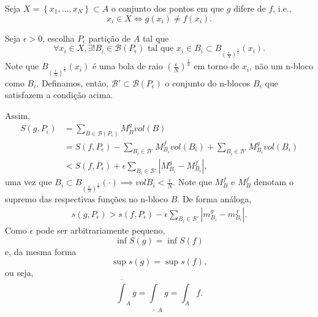 \documentclass[a4paper]{report}
\begin{document}

Seja $X=\left\{ x_1,\ldots,x_N \right\} \subset A$ o conjunto dos pontos em que $g$ difere de $f$, i.e., \[
x_i\in X \iff g\left( x_i \right) \neq f\left( x_i \right) 
.\] 

Seja $\epsilon>0$, escolha $P_\epsilon$ partição de $A$ tal que \[
    \forall x_i \in X, \exists! B_i\in \mathcal{B}\left( P_\epsilon \right) \text{ tal que } x_i\in  B_i \subset B_{\left( \frac{\epsilon}{N} \right)^{\frac{1}{n}}}\left( x_i \right) 
.\] Note que $B_{\left( \frac{\epsilon}{N} \right)^{\frac{1}{n}}}\left( x_i \right) $ é uma bola de raio $\left( \frac{\epsilon}{N} \right)^{\frac{1}{n}}$ em torno de $x_i$, não um n-bloco como $B_i$. Definamos, então, $\mathcal{B}'\subset \mathcal{B}\left( P_\epsilon \right) $ o conjunto do n-blocos $B_i$ que satisfazem a condição acima.

Assim,
\begin{align*}
    S\left( g,P_\epsilon \right) &=\sum_{B\in \mathcal{B}\left( P_\epsilon \right) } M_B^{g} vol\left( B \right) \\
			&= S\left( f, P_\epsilon \right) - \sum_{B_i\in \mathcal{B}' } M_{B_i}^{f} vol\left( B_i \right) + \sum_{B_i\in \mathcal{B}' } M_{B_i}^{g} vol\left( B_i \right) \\
			&< S\left( f, P_\epsilon \right) + \epsilon\sum_{B_i\in \mathcal{B}' } \left| M_{B_i}^{g} - M_{B_i}^{f} \right|
,\end{align*}
uma vez que $B_i \subset B_{\left( \frac{\epsilon}{N} \right)^{\frac{1}{n}}}\left( \cdot  \right)  \implies vol B_i < \frac{\epsilon}{N} $. Note que $M_B^{f}$ e $M_B^{f}$ denotam o supremo das respectivas funções no n-bloco $B$. De forma análoga,
\begin{align*}
    s\left( g,P_\epsilon \right) > s\left( f, P_\epsilon \right) - \epsilon\sum_{B_i\in \mathcal{B}' } \left| m_{B_i}^{g} - m_{B_i}^{f} \right|
.\end{align*}
Como $\epsilon$ pode ser arbitrariamente pequeno, \[
\inf S\left( g \right) = \inf S\left( f \right) 
\] e, da mesma forma \[
\sup s\left( g \right) = \sup s\left( f \right) 
,\] ou seja, \[
\overline{\int}_A g = \underline{\int}_A g = \int_A f
.\] 

\end{document}
